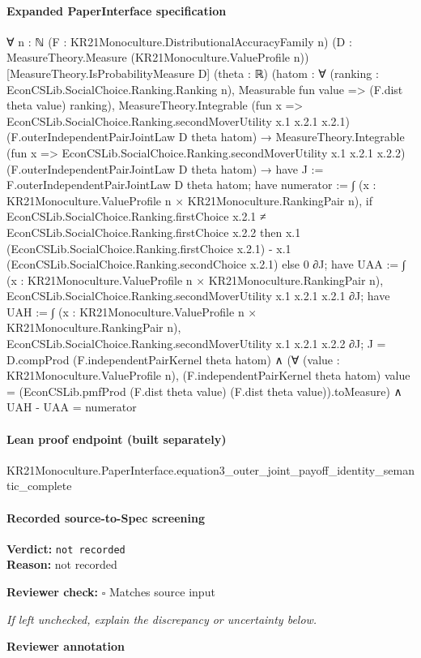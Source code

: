 \documentclass[10pt]{article}
\newcommand{\reviewerbox}{%
  \par\noindent\fbox{\parbox{0.96\linewidth}{\rule{0pt}{0.38in}}}\par
}
\newcommand{\reviewmatch}[1]{%
  \par\noindent\textbf{Reviewer check:} $\square$\; #1\par
  \noindent\emph{If left unchecked, explain the discrepancy or uncertainty below.}\par
}
\begin{document}
\paragraph{Expanded PaperInterface specification}
\begin{ReviewVerbatim}
∀ {n : ℕ} (F : KR21Monoculture.DistributionalAccuracyFamily n)
  (D : MeasureTheory.Measure (KR21Monoculture.ValueProfile n)) [MeasureTheory.IsProbabilityMeasure D] (theta : ℝ)
  (hatom :
    ∀ (ranking : EconCSLib.SocialChoice.Ranking.Ranking n), Measurable fun value => (F.dist theta value) ranking),
  MeasureTheory.Integrable (fun x => EconCSLib.SocialChoice.Ranking.secondMoverUtility x.1 x.2.1 x.2.1)
      (F.outerIndependentPairJointLaw D theta hatom) →
    MeasureTheory.Integrable (fun x => EconCSLib.SocialChoice.Ranking.secondMoverUtility x.1 x.2.1 x.2.2)
        (F.outerIndependentPairJointLaw D theta hatom) →
      have J := F.outerIndependentPairJointLaw D theta hatom;
      have numerator :=
        ∫ (x : KR21Monoculture.ValueProfile n × KR21Monoculture.RankingPair n),
          if EconCSLib.SocialChoice.Ranking.firstChoice x.2.1 ≠ EconCSLib.SocialChoice.Ranking.firstChoice x.2.2 then
            x.1 (EconCSLib.SocialChoice.Ranking.firstChoice x.2.1) -
              x.1 (EconCSLib.SocialChoice.Ranking.secondChoice x.2.1)
          else 0 ∂J;
      have UAA :=
        ∫ (x : KR21Monoculture.ValueProfile n × KR21Monoculture.RankingPair n),
          EconCSLib.SocialChoice.Ranking.secondMoverUtility x.1 x.2.1 x.2.1 ∂J;
      have UAH :=
        ∫ (x : KR21Monoculture.ValueProfile n × KR21Monoculture.RankingPair n),
          EconCSLib.SocialChoice.Ranking.secondMoverUtility x.1 x.2.1 x.2.2 ∂J;
      J = D.compProd (F.independentPairKernel theta hatom) ∧
        (∀ (value : KR21Monoculture.ValueProfile n),
            (F.independentPairKernel theta hatom) value =
              (EconCSLib.pmfProd (F.dist theta value) (F.dist theta value)).toMeasure) ∧
          UAH - UAA = numerator
\end{ReviewVerbatim}

\paragraph{Lean proof endpoint (built separately)}\begin{ReviewVerbatim}
KR21Monoculture.PaperInterface.equation3_outer_joint_payoff_identity_semantic_complete
\end{ReviewVerbatim}

\paragraph{Recorded source-to-Spec screening}
\textbf{Verdict:} \texttt{not recorded}
\\
\textbf{Reason:} not recorded
\reviewmatch{Matches source input}
\noindent\textbf{Reviewer annotation}\par
\reviewerbox
\clearpage
\hypertarget{source-claim-ea5f4fa858fd5854}{}
\end{document}
